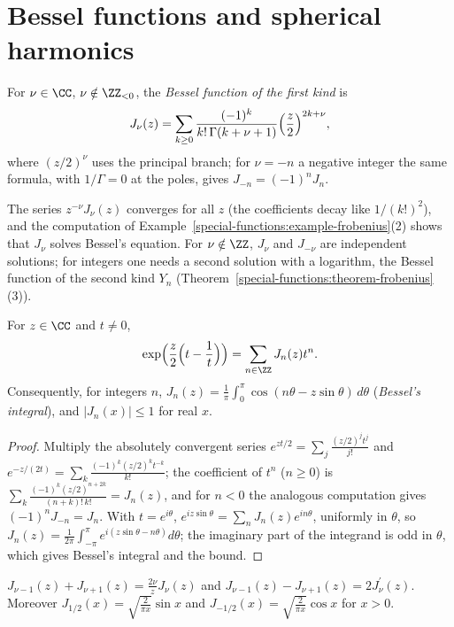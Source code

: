 \section{Bessel functions and spherical harmonics}\label{special-functions:section-bessel}

\begin{definition}\label{special-functions:definition-bessel}
For $\nu \in \CC$, $\nu \notin \ZZ_{<0}$, the \emph{Bessel function of the first kind} is
\[
J_\nu(z) = \sum_{k \geq 0}\frac{(-1)^k}{k!\,\Gamma(k + \nu + 1)}\Bigl(\frac z2\Bigr)^{2k+\nu},
\]
where $(z/2)^\nu$ uses the principal branch; for $\nu = -n$ a negative integer the same formula, with $1/\Gamma = 0$ at the poles, gives $J_{-n} = (-1)^nJ_n$.
\end{definition}

The series $z^{-\nu}J_\nu(z)$ converges for all $z$ (the coefficients decay like $1/(k!)^2$), and the computation of Example~\ref{special-functions:example-frobenius}(2) shows that $J_\nu$ solves Bessel's equation. For
$\nu \notin \ZZ$, $J_\nu$ and $J_{-\nu}$ are independent solutions; for integers one needs a second solution with a logarithm, the Bessel function of the second kind $Y_n$ (Theorem~\ref{special-functions:theorem-frobenius}(3)).

\begin{theorem}\label{special-functions:theorem-bessel-generating}
For $z \in \CC$ and $t \neq 0$,
\[
\exp\Bigl(\frac z2\Bigl(t - \frac1t\Bigr)\Bigr) = \sum_{n \in \ZZ}J_n(z)t^n.
\]
Consequently, for integers $n$, $J_n(z) = \frac1\pi\int_0^\pi\cos(n\theta - z\sin\theta)\,d\theta$ (\emph{Bessel's integral}), and $|J_n(x)| \leq 1$ for real $x$.
\end{theorem}

\begin{proof}
Multiply the absolutely convergent series $e^{zt/2} = \sum_j\frac{(z/2)^jt^j}{j!}$ and $e^{-z/(2t)} = \sum_k\frac{(-1)^k(z/2)^kt^{-k}}{k!}$; the coefficient of $t^n$ ($n \geq 0$) is $\sum_k\frac{(-1)^k(z/2)^{n+2k}}{(n + k)!\,k!} = J_n(z)$,
and for $n < 0$ the analogous computation gives $(-1)^nJ_{-n} = J_n$. With $t = e^{i\theta}$, $e^{iz\sin\theta} = \sum_nJ_n(z)e^{in\theta}$, uniformly in $\theta$, so $J_n(z) = \frac{1}{2\pi}\int_{-\pi}^{\pi}e^{i(z\sin\theta - n\theta)}d\theta$; the
imaginary part of the integrand is odd in $\theta$, which gives Bessel's integral and the bound.
\end{proof}

\begin{proposition}\label{special-functions:proposition-bessel-recurrences}
$J_{\nu-1}(z) + J_{\nu+1}(z) = \frac{2\nu}{z}J_\nu(z)$ and $J_{\nu-1}(z) - J_{\nu+1}(z) = 2J_\nu^{\prime}(z)$. Moreover
$J_{1/2}(x) = \sqrt{\frac{2}{\pi x}}\sin x$ and $J_{-1/2}(x) = \sqrt{\frac{2}{\pi x}}\cos x$ for $x > 0$.
\end{proposition}

